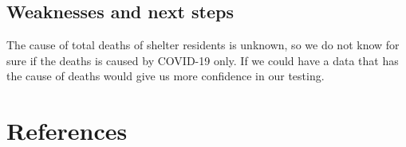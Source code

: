 \documentclass[
  letterpaper,
  DIV=11,
  numbers=noendperiod]{scrartcl}
\begin{document}
\hypertarget{weaknesses-and-next-steps}{%
\subsection{Weaknesses and next steps}\label{weaknesses-and-next-steps}}

The cause of total deaths of shelter residents is unknown, so we do not
know for sure if the deaths is caused by COVID-19 only. If we could have
a data that has the cause of deaths would give us more confidence in our
testing.

\newpage

\hypertarget{references}{%
\section{References}\label{references}}
\end{document}
